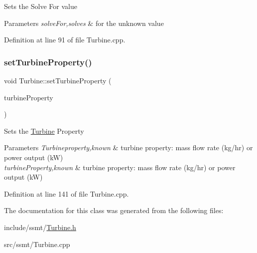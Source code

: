 Sets the Solve For value


\begin{DoxyParams}{Parameters}
{\em solve\+For,solves} & for the unknown value \\
\hline
\end{DoxyParams}


Definition at line 91 of file Turbine.\+cpp.

\mbox{\label{class_turbine_abb3f16cefe52f4e9c7b32b2bb17a68ee}} 
\subsubsection{\texorpdfstring{set\+Turbine\+Property()}{setTurbineProperty()}}
{\footnotesize\ttfamily void Turbine\+::set\+Turbine\+Property (\begin{DoxyParamCaption}\item[{\hyperlink{class_turbine_a5db4f65cf2539e3837684d53221ade12}{Turbine\+::\+Turbine\+Property}}]{turbine\+Property }\end{DoxyParamCaption})}

Sets the \hyperlink{class_turbine}{Turbine} Property


\begin{DoxyParams}{Parameters}
{\em Turbineproperty,known} & turbine property\+: mass flow rate (kg/hr) or power output (kW) \\
\hline
{\em turbine\+Property,known} & turbine property\+: mass flow rate (kg/hr) or power output (kW) \\
\hline
\end{DoxyParams}


Definition at line 141 of file Turbine.\+cpp.



The documentation for this class was generated from the following files\+:\begin{DoxyCompactItemize}
\item 
include/ssmt/\hyperlink{_turbine_8h}{Turbine.\+h}\item 
src/ssmt/Turbine.\+cpp\end{DoxyCompactItemize}
